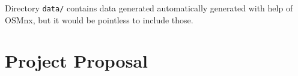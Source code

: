 \documentclass[12pt,a4paper,twoside,openright]{report}
\begin{document}
\noindent Directory \texttt{data/} contains data generated automatically generated with help of OSMnx, but it would be pointless to include those.







\chapter{Project Proposal}

%
\end{document}
